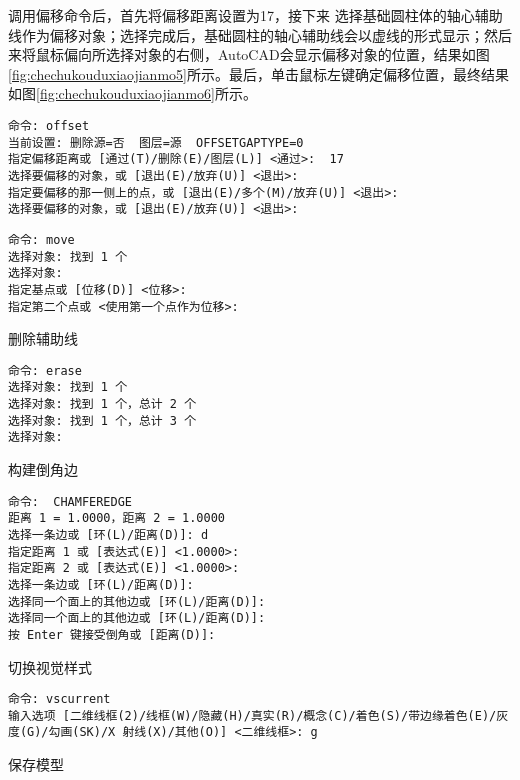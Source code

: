 \begin{procedure}
调用偏移命令后，首先将偏移距离设置为17，接下来 选择基础圆柱体的轴心辅助线作为偏移对象；选择完成后，基础圆柱的轴心辅助线会以虚线的形式显示；然后来将鼠标偏向所选择对象的右侧，AutoCAD会显示偏移对象的位置，结果如图\ref{fig:chechukouduxiaojianmo5}所示。最后，单击鼠标左键确定偏移位置，最终结果如图\ref{fig:chechukouduxiaojianmo6}所示。
\begin{lstlisting}
命令: offset
当前设置: 删除源=否  图层=源  OFFSETGAPTYPE=0
指定偏移距离或 [通过(T)/删除(E)/图层(L)] <通过>:  17
选择要偏移的对象，或 [退出(E)/放弃(U)] <退出>:
指定要偏移的那一侧上的点，或 [退出(E)/多个(M)/放弃(U)] <退出>:
选择要偏移的对象，或 [退出(E)/放弃(U)] <退出>:
\end{lstlisting}
\begin{lstlisting}
命令: move
选择对象: 找到 1 个
选择对象:
指定基点或 [位移(D)] <位移>:
指定第二个点或 <使用第一个点作为位移>:
\end{lstlisting}
\item 删除辅助线
\begin{lstlisting}
命令: erase
选择对象: 找到 1 个
选择对象: 找到 1 个，总计 2 个
选择对象: 找到 1 个，总计 3 个
选择对象:
\end{lstlisting}
\item 构建倒角边
\begin{lstlisting}
命令:  CHAMFEREDGE
距离 1 = 1.0000，距离 2 = 1.0000
选择一条边或 [环(L)/距离(D)]: d
指定距离 1 或 [表达式(E)] <1.0000>:
指定距离 2 或 [表达式(E)] <1.0000>:
选择一条边或 [环(L)/距离(D)]:
选择同一个面上的其他边或 [环(L)/距离(D)]:
选择同一个面上的其他边或 [环(L)/距离(D)]:
按 Enter 键接受倒角或 [距离(D)]:
\end{lstlisting}
\item 切换视觉样式
\begin{lstlisting}
命令: vscurrent
输入选项 [二维线框(2)/线框(W)/隐藏(H)/真实(R)/概念(C)/着色(S)/带边缘着色(E)/灰度(G)/勾画(SK)/X 射线(X)/其他(O)] <二维线框>: g
\end{lstlisting}

\item 保存模型
\end{procedure}
\endinput